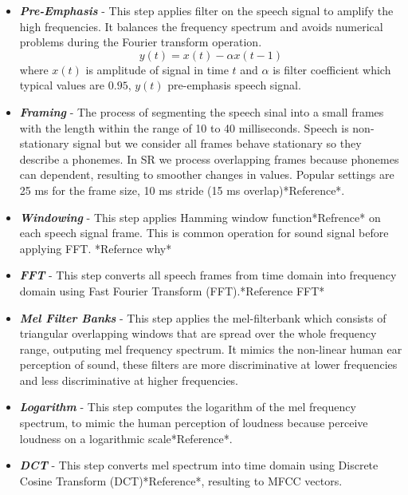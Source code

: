 \begin{itemize}
	\item \textit{\textbf{Pre-Emphasis}} - This step applies filter on the speech signal to amplify the high frequencies. It balances the frequency spectrum and avoids numerical problems during the Fourier transform operation.
    \[ y(t) = x(t) - {\alpha}x(t-1) \]
    where $x(t)$ is amplitude of signal in time $t$ and $\alpha$ is filter coefficient which typical values are $0.95$, $y(t)$ pre-emphasis speech signal.

	\item \textit{\textbf{Framing}} - The process of segmenting the speech sinal into a small frames with the length within the range of 10 to 40 milliseconds.
  Speech is non-stationary signal but we consider all frames behave stationary so they describe a phonemes.
  In SR we process overlapping frames because phonemes can dependent, resulting to smoother changes in values.
  Popular settings are 25 ms for the frame size, 10 ms stride (15 ms overlap)*Reference*.

  \item \textit{\textbf{Windowing}} - This step applies Hamming window function*Refrence* on each speech signal frame. This is common operation for sound signal before applying FFT.
  *Refernce why* %

  \item \textit{\textbf{FFT}} - This step converts all speech frames from time domain into frequency domain using Fast Fourier Transform (FFT).*Reference FFT*

  \item \textit{\textbf{Mel Filter Banks}} - This step applies the mel-filterbank which consists of triangular overlapping windows that are spread over the whole frequency range, outputing mel frequency spectrum.
	It mimics the non-linear human ear perception of sound, these filters are more discriminative at lower frequencies and less discriminative at higher frequencies.

  \item \textit{\textbf{Logarithm}} - This step computes the logarithm of the mel frequency spectrum, to mimic the human perception of loudness because perceive loudness on a logarithmic scale*Reference*.

  \item \textit{\textbf{DCT}} - This step converts mel spectrum into time domain using Discrete Cosine Transform (DCT)*Reference*, resulting to MFCC vectors.

\end{itemize}
